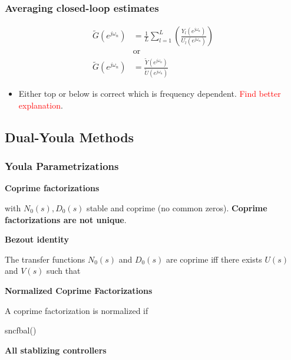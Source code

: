 \documentclass[10pt,a4paper]{scrartcl}
\newcommand{\ejon}{(e^{j\omega_n})}
\begin{document}
\begin{multicols*}{2}
\subsubsection{Averaging closed-loop estimates}

\mportant{$U_l\ejon,Y_l\ejon$}

\begin{align*}
\tilde{G}\ejon&=\frac{1}{L}\sum\limits_{l=1}^L\left(\frac{Y_l\ejon}{U_l\ejon}\right)\\
&\text{or}\\
\tilde{G}\ejon&=\frac{\tilde{Y}\ejon}{\tilde{U}\ejon}
\end{align*}

\begin{itemize}
\item Either top or below is correct which is frequency dependent. \textcolor{red}{Find better explanation}.
\end{itemize}

\subsection{Dual-Youla Methods}

\subsubsection{Youla Parametrizations}

\textbf{Coprime factorizations}


with $N_0(s),D_0(s)$ stable and coprime (no common zeros). \textbf{Coprime factorizations are not unique}.

\vspace{3ex}

\textbf{Bezout identity}

The transfer functions $N_0(s)$ and $D_0(s)$ are coprime iff there exists $U(s)$ and $V(s)$ such that


\textbf{Normalized Coprime Factorizations}

A coprime factorization is normalized if


\begin{TPMatlab}
sncfbal()
\end{TPMatlab}

\textbf{All stablizing controllers}


\end{multicols*}
\end{document}
